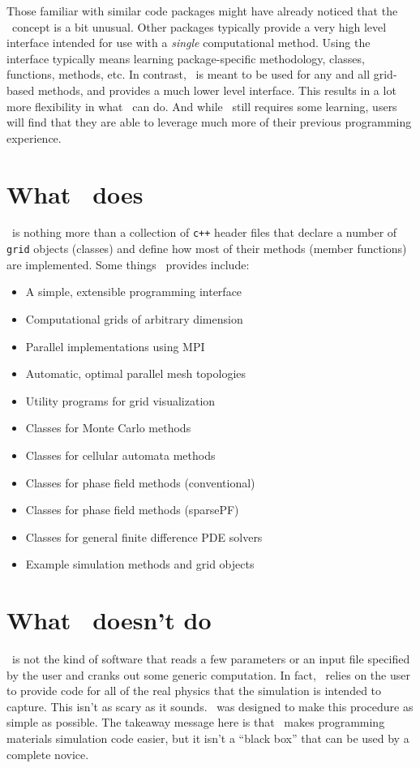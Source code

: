 Those familiar with similar code packages might have already noticed that the \MMSP\ concept is a bit unusual. Other packages typically provide a very high level interface intended for use with a {\em single} computational method.  Using the interface typically means learning package-specific methodology, classes, functions, methods, etc.  In contrast, \MMSP\ is meant to be used for any and all grid-based methods, and provides a much lower level interface.  This results in a lot more flexibility in what \MMSP\ can do.  And while \MMSP\ still requires some learning, users will find that they are able to leverage much more of their previous programming experience.

\section{What \MMSP\ does}
\MMSP\ is nothing more than a collection of {\tt c++} header files that declare a number of {\tt grid} objects (classes) and define how most of their methods (member functions) are implemented.  Some things \MMSP\ provides include:
\begin{itemize}
\item A simple, extensible programming interface
\item Computational grids of arbitrary dimension
\item Parallel implementations using MPI
\item Automatic, optimal parallel mesh topologies
\item Utility programs for grid visualization
\item Classes for Monte Carlo methods
\item Classes for cellular automata methods 
\item Classes for phase field methods (conventional)
\item Classes for phase field methods (sparsePF)
\item Classes for general finite difference PDE solvers
\item Example simulation methods and grid objects
\end{itemize}

\section{What \MMSP\ doesn't do}
\MMSP\ is not the kind of software that reads a few parameters or an input file specified by the user and cranks out some generic computation. In fact, \MMSP\ relies on the user to provide code for all of the real physics that the simulation is intended to capture. This isn't as scary as it sounds. \MMSP\ was designed to make this procedure as simple as possible. The takeaway message here is that \MMSP\ makes programming materials simulation code easier, but it isn't a ``black box'' that can be used by a complete novice.

